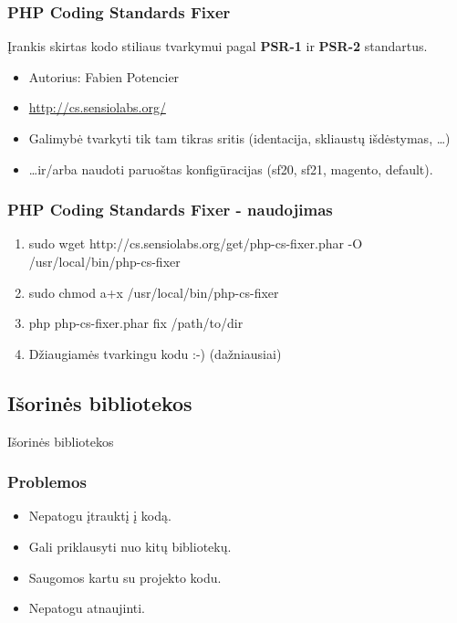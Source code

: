 \documentclass[12pt,a4paper]{beamer}
\begin{document}
\begin{frame}
    \frametitle{PHP Coding Standards Fixer}
    Įrankis skirtas kodo stiliaus tvarkymui pagal \textbf{PSR-1} ir \textbf{PSR-2} standartus.
    \begin{itemize}
        \item Autorius: Fabien Potencier
        \item \url{http://cs.sensiolabs.org/}
        \item Galimybė tvarkyti tik tam tikras sritis (identacija, skliaustų išdėstymas, \dots)
        \item \dots ir/arba naudoti paruoštas konfigūracijas (sf20, sf21, magento, default).
    \end{itemize}
\end{frame}

\begin{frame}
    \frametitle{PHP Coding Standards Fixer - naudojimas}
    {\small
        \begin{enumerate}
            \item sudo wget http://cs.sensiolabs.org/get/php-cs-fixer.phar -O /usr/local/bin/php-cs-fixer
            \item sudo chmod a+x /usr/local/bin/php-cs-fixer
            \item php php-cs-fixer.phar fix /path/to/dir
            \item Džiaugiamės tvarkingu kodu :-) \pause(dažniausiai)
        \end{enumerate}
    }
\end{frame}

\subsection{Išorinės bibliotekos}
\begin{frame}[fragile]

    {\Huge Išorinės bibliotekos}
\end{frame}

\begin{frame}
    \frametitle{Problemos}
    \begin{itemize}
        \item Nepatogu įtrauktį į kodą.
        \item Gali priklausyti nuo kitų bibliotekų.
        \item Saugomos kartu su projekto kodu.
        \item Nepatogu atnaujinti.
    \end{itemize}
\end{frame}
\end{document}
